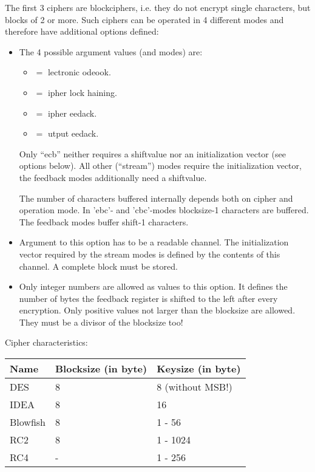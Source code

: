 The first 3 ciphers are blockciphers, i.e. they do not encrypt single
characters, but blocks of 2 or more. Such ciphers can be operated in 4
different modes and therefore have additional options defined:

\begin {itemize}
\item[-mode]	The 4 possible argument values (and modes) are:
	\begin {itemize}
	\item[ecb]	$=$ lectronic odeook.
	\item[cbc]	$=$ ipher lock haining.
	\item[cfb]	$=$ ipher eedack.
	\item[ofb]	$=$ utput eedack.
	\end   {itemize}

	Only ``ecb'' neither requires a shiftvalue nor an initialization
	vector (see options below). All other (``stream'') modes require
	the initialization vector, the feedback modes additionally
	need a shiftvalue.

	The number of characters buffered internally depends both on
	cipher and operation mode.
	In 'ebc'- and 'cbc'-modes blocksize-1 characters are buffered.
	The feedback modes buffer shift-1 characters.


\item[-iv]	Argument to this option has to be a readable
		channel. The initialization vector required by the
		stream modes is defined by the contents of this
		channel. A complete block must be stored.

\item[-shift]	Only integer numbers are allowed as values to this
		option. It defines the number of bytes the feedback
		register is shifted to the left after every
		encryption. Only positive values not larger than the
		blocksize are allowed. They must be a divisor of the
		blocksize too!
\end   {itemize}


Cipher characteristics:

\begin {center}
	\begin {tabular}{|l|l|l|}\hline
	Name		& Blocksize (in byte)	& Keysize (in byte) \\ \hline\hline
	DES		& 8			& 8 (without MSB!) \\ \hline
	IDEA		& 8			& 16 \\ \hline
	Blowfish	& 8			& 1 - 56 \\ \hline\hline
	RC2		& 8			& 1 - 1024\footnotemark{a} \\ \hline
	RC4		& -			& 1 - 256 \\ \hline
	\end   {tabular}
\end   {center}

